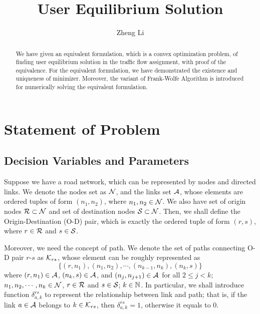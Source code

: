 \documentclass{article}
\title{User Equilibrium Solution}
\author{Zheng Li}
\begin{document}
\maketitle

\begin{abstract}
    We have given an equivalent formulation, which is a convex optimization problem, of finding user equilibrium solution in the traffic flow assignment, with proof of the equivalence. For the equivalent formulation, we have demonstrated the existence and uniqueness of minimizer. Moreover, the variant of Frank-Wolfe Algorithm is introduced for numerically solving the equivalent formulation.
\end{abstract}

\section{Statement of Problem}

\subsection{Decision Variables and Parameters}

Suppose we have a road network, which can be represented by nodes and directed links. We denote the nodes set as $ \mathcal{N} $, and the links set $ \mathcal{A} $, whose elements are ordered tuples of form $ (n_1, n_2) $, where $ n_1, n_2 \in \mathcal{N} $. We also have set of origin nodes $ \mathcal{R} \subset \mathcal{N} $ and set of destination nodes $ \mathcal{S} \subset \mathcal{N} $. Then, we shall define the Origin-Destination (O-D) pair, which is exactly the ordered tuple of form $ (r, s) $, where $ r \in \mathcal{R} $ and $ s \in \mathcal{S} $.

Moreover, we need the concept of path. We denote the set of paths connecting O-D pair $ r $-$ s $ as $ \mathcal{K}_{rs} $, whose element can be roughly represented as
$$ \{ (r, n_1), (n_1, n_2), \cdots, (n_{k-1}, n_k), (n_k, s) \} $$ 
where $ (r, n_1) \in \mathcal{A} $, $ (n_k, s) \in \mathcal{A} $, and $ (n_j, n_{j+1}) \in \mathcal{A} $ for all $ 2 \le j < k $; $ n_1, n_2, \cdots, n_k \in \mathcal{N} $, $ r \in \mathcal{R} $ and $ s \in \mathcal{S} $; $ k \in \mathbb{N} $. In particular, we shall introduce function $ \delta_{a, k}^{rs} $ to represent the relationship between link and path; that is, if the link $ a \in \mathcal{A} $ belongs to $ k \in \mathcal{K}_{rs} $, then $ \delta_{a, k}^{rs} = 1 $, otherwise it equals to $ 0 $.
\end{document}
